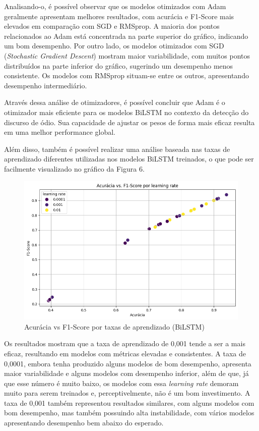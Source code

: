 \documentclass[conference]{IEEEtran}
\begin{document}
Analisando-o, é possível observar que os modelos otimizados com Adam geralmente apresentam melhores resultados, com acurácia e F1-Score mais elevados em comparação com SGD e RMSprop. A maioria dos pontos relacionados ao Adam está concentrada na parte superior do gráfico, indicando um bom desempenho. Por outro lado, os modelos otimizados com SGD (\textit{Stochastic Gradient Descent}) mostram maior variabilidade, com muitos pontos distribuídos na parte inferior do gráfico, sugerindo um desempenho menos consistente. Os modelos com RMSprop situam-se entre os outros, apresentando desempenho intermediário.

Através dessa análise de otimizadores, é possível concluir que Adam é o otimizador mais eficiente para os modelos BiLSTM no contexto da detecção do discurso de ódio. Sua capacidade de ajustar os pesos de forma mais eficaz resulta em uma melhor performance global.

Além disso, também é possível realizar uma análise baseada nas taxas de aprendizado diferentes utilizadas nos modelos BiLSTM treinados, o que pode ser facilmente visualizado no gráfico da Figura 6.

\begin{figure}[h!]
    \centering
    \includegraphics[width=\linewidth]{images/bilstm-lr.png}
    \caption{Acurácia vs F1-Score por taxas de aprendizado (BiLSTM)}
    \label{fig:exemplo5}
\end{figure}

Os resultados mostram que a taxa de aprendizado de 0,001 tende a ser a mais eficaz, resultando em modelos com métricas elevadas e consistentes. A taxa de 0,0001, embora tenha produzido alguns modelos de bom desempenho, apresenta maior variabilidade e alguns modelos com desempenho inferior, além de que, já que esse número é muito baixo, os modelos com essa \textit{learning rate} demoram muito para serem treinados e, perceptivelmente, não é um bom investimento. A taxa de 0,001 também representou resultados similares, com alguns modelos com bom desempenho, mas também possuindo alta instabilidade, com vários modelos apresentando desempenho bem abaixo do esperado.
\end{document}

